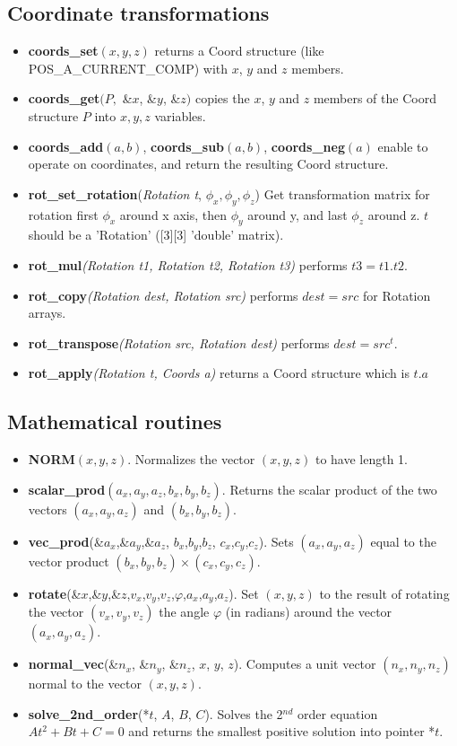 \subsection{Coordinate transformations}
\begin{itemize}
\item {\bfseries coords\_set}$(x,y,z)$ returns a Coord structure (like POS\_A\_CURRENT\_COMP) with $x$, $y$ and $z$ members.
\item {\bfseries  coords\_get}$(P,$ \&$x$, \&$y$, \&$z)$ copies the $x$, $y$ and
$z$ members of the Coord structure $P$ into $x,y,z$ variables.
\item {\bfseries coords\_add}$(a,b)$, {\bfseries coords\_sub}$(a,b)$, {\bfseries
coords\_neg}$(a)$ enable to  operate on coordinates, and return the
resulting Coord structure.
\item {\bfseries rot\_set\_rotation}(\textit{Rotation t}, $\phi_x, \phi_y, \phi_z$)
  Get transformation matrix for rotation
  first $\phi_x$ around x axis, then $\phi_y$ around y,
  and last $\phi_z$ around z. $t$ should be a 'Rotation' ([3][3] 'double' matrix).
\item {\bfseries rot\_mul}\textit{(Rotation t1, Rotation t2, Rotation t3)} performs $t3 = t1 . t2$.
\item {\bfseries rot\_copy}\textit{(Rotation dest, Rotation src)} performs $dest = src$ for Rotation arrays.
\item {\bfseries rot\_transpose}\textit{(Rotation src, Rotation dest)} performs $dest = src^t$.
\item {\bfseries rot\_apply}\textit{(Rotation t, Coords a)} returns a Coord structure which is $t.a$
\end{itemize}

\subsection{Mathematical routines}
\begin{itemize}
\item {\bfseries NORM}$(x,y,z)$. Normalizes the vector $(x,y,z)$ to have
  length 1.
\item {\bfseries scalar\_prod}$(a_x,a_y,a_z, b_x,b_y,b_z)$. Returns the scalar
  product of the two vectors $(a_x,a_y,a_z)$ and $(b_x,b_y,b_z)$.
\item {\bfseries vec\_prod}(\&$a_x$,\&$a_y$,\&$a_z$, $b_x$,$b_y$,$b_z$, $c_x$,$c_y$,$c_z$). Sets
  $(a_x,a_y,a_z)$ equal to the vector product $(b_x,b_y,b_z) \times (c_x,c_y,c_z)$.
\item {\bfseries rotate}(\&$x$,\&$y$,\&$z$,$v_x$,$v_y$,$v_z$,$\varphi$,$a_x$,$a_y$,$a_z$). Set
  $(x,y,z)$ to the result of rotating the vector $(v_x,v_y,v_z)$
  the angle $\varphi$ (in radians) around the vector $(a_x,a_y,a_z)$.
\item {\bfseries normal\_vec}(\&$n_x$, \&$n_y$, \&$n_z$, $x$, $y$, $z$).
  Computes a unit vector $(n_x, n_y, n_z)$ normal to the vector
  $(x,y,z)$.
\item {\bfseries solve\_2nd\_order}(*$t$, $A$,  $B$,  $C$).
  Solves the 2$^{nd}$ order equation $At^2 + Bt + C = 0$ and returns
  the smallest positive solution into pointer *$t$.
\end{itemize}

